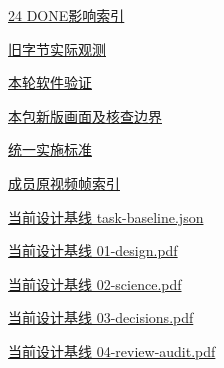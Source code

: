 \documentclass[11pt,a4paper]{article}
\begin{document}
\href{file:///D:/Agent/srp/agent/tasks/U12-09/outputs/old-done-impact.csv}{24 DONE影响索引}


\href{file:///D:/Agent/srp/agent/tasks/U12-09/outputs/legacy-byte-observations.json}{旧字节实际观测}


\href{file:///D:/Agent/srp/agent/tasks/U12-09/evidence/verification.json}{本轮软件验证}


\href{file:///D:/Agent/srp/agent/tasks/U12-09/outputs/current-implementation-evidence.md}{本包新版画面及核查边界}


\href{file:///D:/Agent/srp/agent/design/weather/2026-10-08_Storm\%E4\%B8\%8E\%E7\%BA\%AF\%E7\%B2\%92\%E5\%AD\%90\%E5\%8F\%8C\%E7\%8E\%AF\%E5\%AE\%9E\%E6\%96\%BD\%E6\%A0\%87\%E5\%87\%86.md}{统一实施标准}


\href{file:///D:/Agent/srp/human/assets/previews/2026-10-08/member-storm-particle-rings/frame-index.json}{成员原视频帧索引}


\href{file:///D:/Agent/srp/agent/design/design-foundation-20261008/task-baseline.json}{当前设计基线 task-\allowbreak{}baseline.json}


\href{file:///D:/Agent/srp/agent/design/design-foundation-20261008/01-design.pdf}{当前设计基线 01-\allowbreak{}design.pdf}


\href{file:///D:/Agent/srp/agent/design/design-foundation-20261008/02-science.pdf}{当前设计基线 02-\allowbreak{}science.pdf}


\href{file:///D:/Agent/srp/agent/design/design-foundation-20261008/03-decisions.pdf}{当前设计基线 03-\allowbreak{}decisions.pdf}


\href{file:///D:/Agent/srp/agent/design/design-foundation-20261008/04-review-audit.pdf}{当前设计基线 04-\allowbreak{}review-\allowbreak{}audit.pdf}
\end{document}
